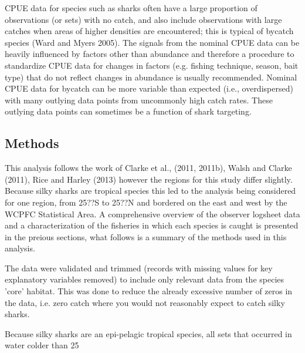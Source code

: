 \documentclass[12pt]{SCreport}
\begin{document}
CPUE data for species such as sharks often have a large proportion of observations (or sets) with no catch, and also include observations with large catches when areas of higher densities are encountered; this is typical of bycatch species (Ward and Myers  2005). The signals from the nominal  CPUE data can be heavily influenced by factors other than abundance and therefore a procedure to standardize CPUE data for changes in factors (e.g. fishing technique, season, bait type) that do not reflect changes in abundance is usually recommended. Nominal CPUE data for bycatch can be more variable than expected (i.e., overdispersed) with many outlying data points from uncommonly high catch rates. These outlying data points can sometimes be a function of shark targeting.



      \subsection{Methods}
      This analysis follows the work of Clarke et al., (2011, 2011b),  Walsh and Clarke (2011), Rice and Harley (2013) however the regions for this study differ slightly. Because silky sharks are tropical species this led to the analysis being considered for one region, from 25??S to 25??N and bordered on the east and west by the WCPFC Statistical Area. A comprehensive overview of the observer logsheet data and a characterization of the fisheries in which each species is caught is presented in the preious sections, what follows is a summary of the methods used in this analysis.
      
      The data were validated and trimmed (records with missing values for key explanatory variables removed) to include only relevant data from the species 'core' habitat. This was done to reduce the already excessive number of zeros in the data, i.e. zero catch where you would not reasonably expect to catch silky sharks.
      
      
Because silky sharks are an epi-pelagic tropical species, all sets that occurred in water colder than 25%
\end{document}
